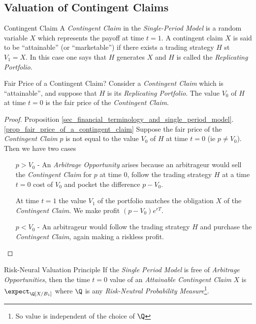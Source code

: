 \documentclass[11pt,a4paper]{article}
\begin{document}
\subsection{Valuation of Contingent Claims}

  \begin{definition}{Contingent Claim}\label{def_contingent_claim_single_period}
    A \textit{Contingent Claim} in the \textit{Single-Period Model} is a random variable $X$ which represents the payoff at time $t=1$. A contingent claim $X$ is said to be ``attainable'' (or ``marketable'') if there exists a trading strategy $H$ st $V_1=X$. In this case one says that $H$ generates $X$ and $H$ is called the \textit{Replicating Portfolio}.
  \end{definition}

  \begin{proposition}{Fair Price of a Contingent Claim?}\label{prop_fair_price_of_a_contingent_claim}
    Consider a \textit{Contingent Claim} which is ``attainable'', and suppose that $H$ is its \textit{Replicating Portfolio}. The value $V_0$ of $H$ at time $t=0$ is the fair price of the \textit{Contingent Claim}.
  \end{proposition}

  \begin{proof}{Proposition \ref{sec_financial_terminology_and_single_period_model}.\ref{prop_fair_price_of_a_contingent_claim}}
    Suppose the fair price of the \textit{Contingent Claim} $p$ is not equal to the value $V_0$ of $H$ at time $t=0$ (ie $p\neq V_0$). Then we have two cases
    \begin{itemize}
      \item[$p>V_0$] - An \textit{Arbitrage Opportunity} arises because an arbitrageur would sell the \textit{Contingent Claim} for $p$ at time 0, follow the trading strategy $H$ at a time $t=0$ cost of $V_0$ and pocket the difference $p-V_0$.
      \par At time $t=1$ the value $V_1$ of the portfolio matches the obligation $X$ of the \textit{Contingent Claim}. We make profit $(p-V_0)e^{rT}$.
      \item[$p<V_0$] - An arbitrageur would follow the trading strategy $H$ and purchase the \textit{Contingent Claim}, again making a riskless profit.
    \end{itemize}
  \end{proof}

  \begin{theorem}{Risk-Neural Valuation Principle}\label{the_risk_neutral_valuation_principle_single_period}
    If the \textit{Single Period Model} is free of \textit{Arbitrage Opportunities}, then the time $t=0$ value of an \textit{Attainable Contingent Claim} $X$ is $\expect_\Q[X/B_1]$ where $\Q$ is any \textit{Risk-Neutral Probability Measure}\footnote{So value is independent of the choice of $\Q$}.
  \end{theorem}
\end{document}
